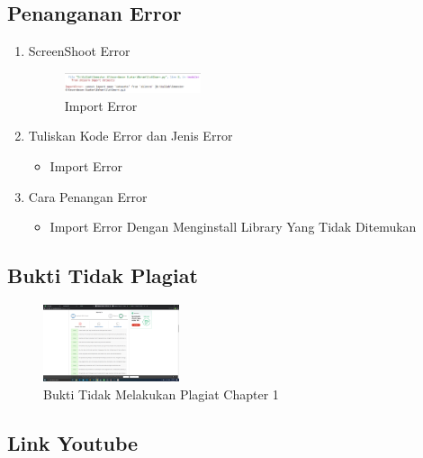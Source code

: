 \subsection{Penanganan Error}
\begin{enumerate}
	\item ScreenShoot Error
	\begin{figure}[H]
		\includegraphics[width=4cm]{figures/1174073/1/error/1.png}
		\centering
		\caption{Import Error}
	\end{figure}

	\item Tuliskan Kode Error dan Jenis Error
	\begin{itemize}
		\item Import Error
	\end{itemize}
	\item Cara Penangan Error
	\begin{itemize}
		\item Import Error
		\hfill\break
		Dengan Menginstall Library Yang Tidak Ditemukan
	\end{itemize}
\end{enumerate}

\subsection{Bukti Tidak Plagiat}
\begin{figure}[H]
	\includegraphics[width=4cm]{figures/1174073/1/plagiat/plagiat.png}
	\centering
	\caption{Bukti Tidak Melakukan Plagiat Chapter 1}
\end{figure}

\subsection{Link Youtube}


